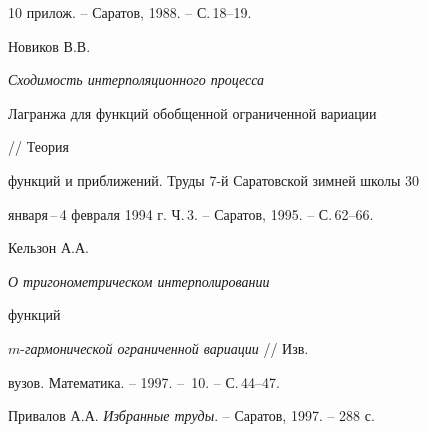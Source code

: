 \begin{thebibliography}{10}
прилож. -- Саратов, 1988. -- С.\,18--19.




Новиков В.В. {\it Сходимость интерполяционного процесса


Лагранжа для функций обобщенной ограниченной вариации} // Теория


функций и приближений. Труды 7-й Саратовской зимней школы 30 


января\,--\,4 февраля 1994 г. Ч.\,3. -- Саратов, 1995. -- С.\,62--66.




Кельзон А.А. {\it О тригонометрическом интерполировании


функций} $m$-{\it гармонической ограниченной вариации} // Изв.


вузов. Математика. -- 1997. -- \No\,10. -- С.\,44--47.




Привалов А.А. {\em Избранные труды}. -- Саратов, 1997. -- 288 с.





\end{thebibliography}





\vskip 0.5cm












\label{end}






